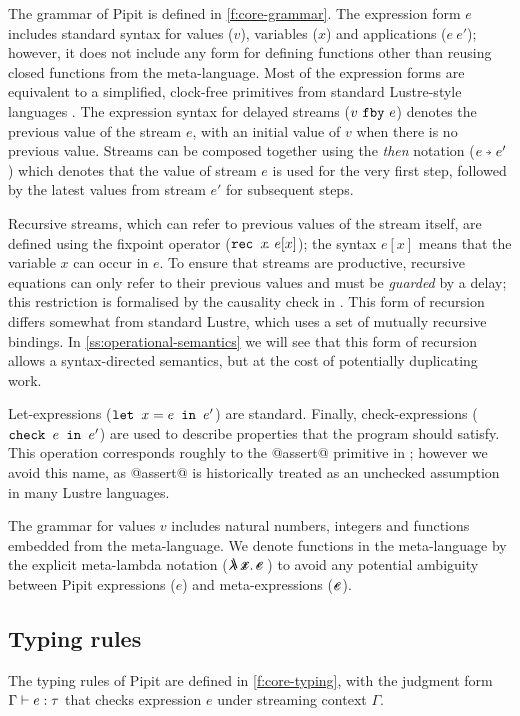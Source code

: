 \documentclass[sigplan,screen]{acmart}
\begin{document}
The grammar of Pipit is defined in \autoref{f:core-grammar}.
The expression form $e$ includes standard syntax for values ($v$), variables ($x$) and applications ($e~e'$); however, it does not include any form for defining functions other than reusing closed functions from the \fstar{} meta-language.
Most of the expression forms are equivalent to a simplified, clock-free primitives from standard Lustre-style languages \cite{caspi1995functional}.
The expression syntax for delayed streams ($v~\texttt{fby}~e$) denotes the previous value of the stream $e$, with an initial value of $v$ when there is no previous value.
Streams can be composed together using the \emph{then} notation ($\xthen{e}{e'}$) which denotes that the value of stream $e$ is used for the very first step, followed by the latest values from stream $e'$ for subsequent steps.

Recursive streams, which can refer to previous values of the stream itself, are defined using the fixpoint operator ($\texttt{rec~} x \!.~e[x]$); the syntax $e[x]$ means that the variable $x$ can occur in $e$.
To ensure that streams are productive, recursive equations can only refer to their previous values and must be \emph{guarded} by a delay; this restriction is formalised by the causality check in \REF{}.
This form of recursion differs somewhat from standard Lustre, which uses a set of mutually recursive bindings.
In \autoref{ss:operational-semantics} we will see that this form of recursion allows a syntax-directed semantics, but at the cost of potentially duplicating work.

Let-expressions ($\texttt{let~} x = e \texttt{~in~} e'$) are standard.
Finally, check-expressions ($\texttt{check~} e \texttt{~in~} e'$) are used to describe properties that the program should satisfy.
This operation corresponds roughly to the @assert@ primitive in \fstar{}; however we avoid this name, as @assert@ is historically treated as an unchecked assumption in many Lustre languages.

The grammar for values $v$ includes natural numbers, integers and functions embedded from the \fstar{} meta-language.
We denote functions in the meta-language by the explicit meta-lambda notation ($\mlamX{}$) to avoid any potential ambiguity between Pipit expressions ($e$) and meta-expressions ($\metafy{e}$).

\subsection{Typing rules}
\label{ss:typing-rules}

The typing rules of Pipit are defined in \autoref{f:core-typing}, with the judgment form $\Gamma \vdash e : \tau$ that checks expression $e$ under streaming context $\Gamma$.
\end{document}
